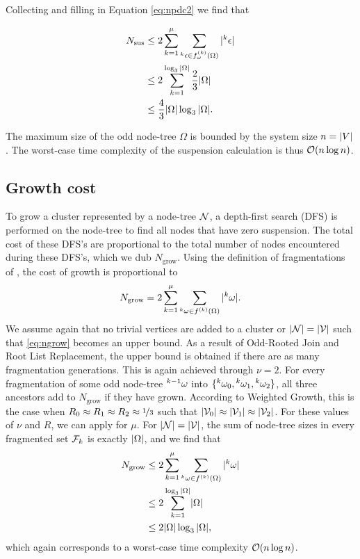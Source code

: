 Collecting  and filling in Equation \eqref{eq:npdc2} we find that

\begin{align*}
  \nonumber N_{\text{sus}} &\leq 2\sum_{k=1}^\mu{ \sum_{  {}^{k} \epsilon \in f_\omega^{(k)}(\Omega) }{ \lvert {}^{k} \epsilon\rvert}  } \\
  \nonumber         &\leq 2\sum_{k=1}^{\log_3{\lvert\Omega\rvert}} \frac{2}{3}\lvert\Omega\rvert\\
                    &\leq \frac{4}{3}\lvert\Omega\rvert\log_3{\lvert\Omega\rvert}.
\end{align*}

The maximum size of the odd node-tree $\Omega$ is bounded by the system size $n = \lvert V\rvert$. The worst-case time complexity of the suspension calculation is thus $\mathcal{O}(n\log{n})$. 

\subsection{Growth cost}\label{sec:growthcost}

To grow a cluster represented by a node-tree $\mathcal{N}$, a depth-first search (DFS) is performed on the node-tree to find all nodes that have zero suspension. The total cost of these DFS's are proportional to the total number of nodes encountered during these DFS's, which we dub $N_{\text{grow}}$. Using the definition of fragmentations of , the cost of growth is proportional to
\begin{equation}\label{eq:ngrow}
  N_{\text{grow}} = 2\sum_{k=1}^\mu{ \sum_{ \pre{k}\omega \in f^{(k)}(\Omega) }{ \abs{\pre{k}\omega}} }.
\end{equation}
We assume again that no trivial vertices are added  to a cluster or $|\mathcal{N}| = |\mathcal{V}|$ such that \eqref{eq:ngrow} becomes an upper bound. As a result of Odd-Rooted Join and Root List Replacement, the upper bound is obtained if there are as many fragmentation generations. This is again achieved through $\nu = 2$. For every fragmentation of some odd node-tree ${}^{k-1}\omega$ into $\{{}^{k}\omega_0, {}^{k}\omega_1, {}^{k}\omega_2\}$, all three ancestors add to $N_{\text{grow}}$ if they have grown. According to Weighted Growth, this is the case when $R_0 \approx R_1 \approx R_2\approx \nicefrac{1}{3}$ such that $\lvert\mathcal{V}_0\rvert\approx \lvert\mathcal{V}_1\rvert\approx\lvert\mathcal{V}_2\rvert$. For these values of $\nu$ and $R$, we can apply  for $\mu$. For $|\mathcal{N}| = |\mathcal{V}|$, the sum of node-tree sizes in every fragmented set $\mathcal{F}_k$ is exactly $\lvert\Omega\rvert$, and we find that
\begin{align*}
  \nonumber N_{\text{grow}} &\leq 2\sum_{k=1}^\mu{ \sum_{  {}^{k} \omega \in f^{(k)}(\Omega) }{ \lvert {}^{k} \omega\rvert}  } \\
  \nonumber         &\leq 2\sum_{k=1}^{\log_3{\lvert\Omega\rvert}} \lvert\Omega\rvert\\
                    &\leq 2\lvert\Omega\rvert\log_3{\lvert\Omega\rvert},
\end{align*}
which again corresponds to a worst-case time complexity $\mathcal{O}(n\log{n})$.